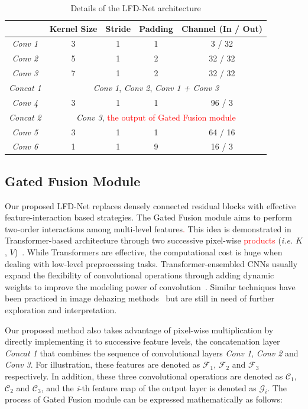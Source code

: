 \documentclass[lettersize,journal]{IEEEtran}
\begin{document}
\begin{table}[pth]
    \caption{Details of the LFD-Net architecture\label{tab:table1}}
    \centering
    \begin{tabular}{ccccc}
    \hline
      & Kernel Size & Stride & Padding & Channel (In / Out)\\
    \hline
    \textit{Conv 1} & 3 & 1 & 1 & 3 / 32\\
    \textit{Conv 2} & 5 & 1 & 2 & 32 / 32\\
    \textit{Conv 3} & 7 & 1 & 2 & 32 / 32\\
    \textit{Concat 1} &
    \multicolumn{4}{c}{\textit{Conv 1}, \textit{Conv 2}, \textit{Conv 1 + Conv 3}}\\
    \textit{Conv 4} & 3 & 1 & 1 & 96 / 3\\
    \textit{Concat 2} &
    \multicolumn{4}{c}{\textit{Conv 3}, \textcolor{red}{the output of Gated Fusion module}}\\
    \textit{Conv 5} & 3 & 1 & 1 & 64 / 16\\
    \textit{Conv 6} & 1 & 1 & 9 & 16 / 3\\
    \hline
    \end{tabular}
\end{table}

\subsection{Gated Fusion Module}
Our proposed LFD-Net replaces densely connected residual blocks with effective feature-interaction based strategies. The Gated Fusion module aims to perform two-order interactions among multi-level features\textcolor{red}{.} This idea is demonstrated in Transformer-based architecture through two successive pixel-wise \textcolor{red}{products} (\textit{i.e.} $K$, $V$)~\cite{vaswani2017attention}. While Transformers are effective, the computational cost is huge when dealing with low-level preprocessing tasks. Transformer-ensembled CNNs usually expand the flexibility of convolutional operations through adding dynamic weights to improve the modeling power of convolution~\cite{hu2018squeeze, chen2020dynamic, rao2022hornet}. Similar techniques have been practiced in image dehazing methods~\cite{ren2018gated, chen2019gated} but are still in need of further exploration and interpretation. 

Our proposed method also takes advantage of pixel-wise multiplication by directly implementing it to successive feature levels, the concatenation layer \textit{Concat 1} that combines the sequence of convolutional layers \textit{Conv 1}, \textit{Conv 2} and \textit{Conv 3}. For illustration, these features are denoted as $\mathcal{F}_1$, $\mathcal{F}_2$ and $\mathcal{F}_3$ respectively. In addition, these three convolutional operations are denoted as $\mathcal{C}_1$, $\mathcal{C}_2$ and $\mathcal{C}_3$, and the \textit{i}-th feature map of the output layer is denoted as $\mathcal{G}_i$. The process of Gated Fusion module can be expressed mathematically as follows:
\end{document}
